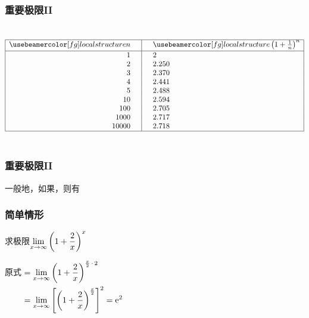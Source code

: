 \documentclass[14pt,notheorems,leqno,xcolor={rgb}]{beamer} %
\begin{document}
\begin{frame}
\frametitle{重要极限II}
\renewcommand*{\arraystretch}{0.95}%
\begin{columns}[onlytextwidth]
\noindent$$\begin{array}{|r<{\quad}|>{\quad}l|}
  \hline
  \pmb n & \pmb\left(1+\frac1n\right)^n \\[2pt]
  \hline
  1 & 2 \\
  2 & 2.250 \\
  3 & 2.370 \\
  4 & 2.441 \\
  5 & 2.488 \\
  10 & 2.594 \\
  100 & 2.705 \\
  1000 & 2.717 \\
  10000 & 2.718 \\
  \hline
\end{array}$$
\end{columns}
\end{frame}

\begin{frame}
\frametitle{重要极限II}
\noindent{}
\vpause
一般地，如果，则有\par
\noindent{}
\end{frame}

\begin{frame}
\frametitle{简单情形}
\begin{example}
求极限$\lim\limits_{x\to\infty}\left(1+\dfrac2x\right)^x$
\end{example}
\pause
\begin{solution}
原式\unskip$\begin{aligned}[t]
&=\lim\limits_{x\to\infty}\left(1+\dfrac2x\right)^{\frac{x}{2}\,\cdot\,2}\\
&=\lim\limits_{x\to\infty}\left[\left(1+\dfrac2x\right)^{\frac{x}{2}}\right]^2=\mathrm{e}^2
\end{aligned}$
\end{solution}
\end{frame}
\end{document}
